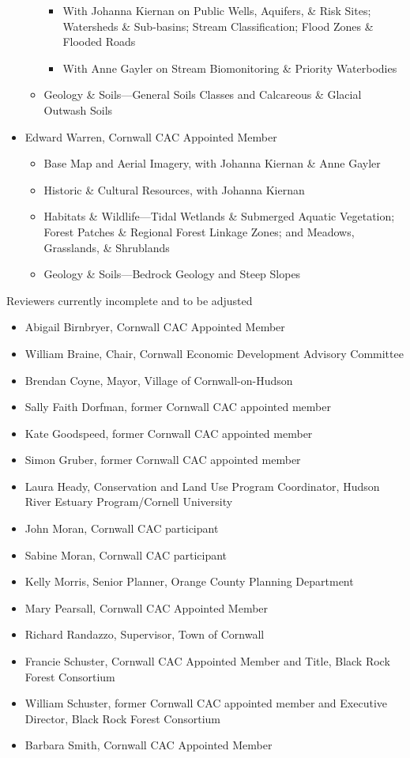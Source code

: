 \begin{itemize}
\begin{itemize}
        \begin{itemize}
            \item With Johanna Kiernan on Public Wells, Aquifers, \& Risk Sites; 
Watersheds \& Sub-basins; Stream Classification; Flood Zones \& Flooded Roads
            \item With Anne Gayler on Stream Biomonitoring \& Priority 
Waterbodies
        \end{itemize}
        \item Geology \& Soils—General Soils Classes and Calcareous \& Glacial 
Outwash Soils
    \end{itemize}
    \item Edward Warren, Cornwall CAC Appointed Member
    \begin{itemize}
        \item Base Map and Aerial Imagery, with Johanna Kiernan \& Anne Gayler
        \item Historic \& Cultural Resources, with Johanna Kiernan
        \item Habitats \& Wildlife—Tidal Wetlands \& Submerged Aquatic 
Vegetation; Forest Patches \& Regional Forest Linkage Zones; and Meadows, 
Grasslands, \& Shrublands
        \item Geology \& Soils—Bedrock Geology and Steep Slopes
    \end{itemize}
\end{itemize}

Reviewers currently incomplete and to be adjusted
\begin{itemize}
    \item Abigail Birnbryer, Cornwall CAC Appointed Member
    \item William Braine, Chair, Cornwall Economic Development Advisory 
Committee
    \item Brendan Coyne, Mayor, Village of Cornwall-on-Hudson
    \item Sally Faith Dorfman, former Cornwall CAC appointed member
    \item Kate Goodspeed, former Cornwall CAC appointed member
    \item Simon Gruber, former Cornwall CAC appointed member
    \item Laura Heady, Conservation and Land Use Program Coordinator, Hudson 
River Estuary Program/Cornell University
    \item John Moran, Cornwall CAC participant
    \item Sabine Moran, Cornwall CAC participant
    \item Kelly Morris, Senior Planner, Orange County Planning Department
    \item Mary Pearsall, Cornwall CAC Appointed Member
    \item Richard Randazzo, Supervisor, Town of Cornwall
    \item Francie Schuster, Cornwall CAC Appointed Member and Title, Black Rock 
Forest Consortium
    \item William Schuster, former Cornwall CAC appointed member and Executive 
Director, Black Rock Forest Consortium
    \item Barbara Smith, Cornwall CAC Appointed Member
\end{itemize}
